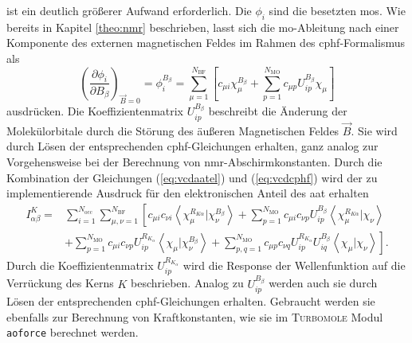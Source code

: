     ist ein deutlich größerer Aufwand erforderlich. Die $\phi_i$ sind die besetzten \acp{mo}. Wie bereits in Kapitel \ref{theo:nmr} beschrieben, lasst sich die \ac{mo}-Ableitung nach einer Komponente des externen magnetischen Feldes im Rahmen des \ac{cphf}-Formalismus als 
    \begin{equation}\label{eq:vcdcphf}
    \left(\frac{\partial \phi_i}{\partial B_\beta}\right)_{\vec{B}=0}=\phi_i^{B_\beta}=\sum_{\mu=1}^{N_{\text{BF}}}\left[c_{\mu i}\chi_\mu^{B_\beta}+\sum_{p=1}^{N_{\text{MO}}}c_{\mu p}U_{ip}^{B_\beta}\chi_\mu\right]
	\end{equation}
	ausdrücken. Die Koeffizientenmatrix $U_{ip}^{B_\beta}$ beschreibt die Änderung der Molekülorbitale durch die Störung des äußeren Magnetischen Feldes $\vec{B}$. Sie wird durch Lösen der entsprechenden \ac{cphf}-Gleichungen erhalten, ganz analog zur Vorgehensweise bei der Berechnung von \ac{nmr}-Abschirmkonstanten. Durch die Kombination der Gleichungen (\ref{eq:vcdaatel}) und  (\ref{eq:vcdcphf}) wird der zu implementierende Ausdruck für den elektronischen Anteil des \ac{aat} erhalten
	\begin{equation}\label{eq:vcdaatelfinal}
	\begin{aligned}
	I^K_{\alpha\beta}=&\sum_{i=1}^{N_{\text{occ}}}\sum_{\mu,\nu=1}^{N_{\text{BF}}}\left[c_{\mu i}c_{\nu i}\left\langle\chi_\mu^{R_{K\alpha}}\vert\chi_\nu^{B_\beta}\right\rangle+\sum_{p=1}^{N_{\text{MO}}}c_{\mu i}c_{\nu p}U_{ip}^{B_\beta}\left\langle\chi_\mu^{R_{K\alpha}}\vert\chi_\nu\right\rangle\right.\\
	&\left.+\sum_{p=1}^{N_{\text{MO}}}c_{\mu i}c_{\nu p}U_{ip}^{R_{K_\alpha}}\left\langle\chi_\mu\vert\chi_\nu^{B_{\beta}}\right\rangle+\sum_{p,q=1}^{N_{\text{MO}}}c_{\mu p}c_{\nu q}U_{ip}^{R_{K_\alpha}}U_{iq}^{B_\beta}\left\langle\chi_\mu\vert\chi_\nu\right\rangle\right].
	\end{aligned}
	\end{equation}
	Durch die Koeffizientenmatrix $U_{ip}^{R_{K_\alpha}}$ wird die Response der Wellenfunktion auf die Verrückung des Kerns $K$ beschrieben. Analog zu $U_{ip}^{B_\beta}$ werden auch sie durch Lösen der entsprechenden \ac{cphf}-Gleichungen erhalten. Gebraucht werden sie ebenfalls zur Berechnung von Kraftkonstanten, wie sie im \textsc{Turbomole} Modul \texttt{aoforce}\supercite{deglmann2002efficient} berechnet werden.
